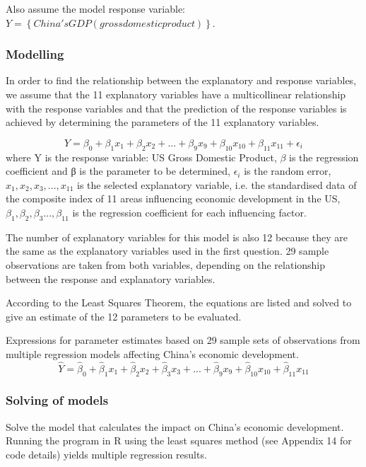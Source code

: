 \documentclass{apmcmthesis}
\begin{document}
Also assume the model response variable: $ Y=\left\lbrace China's GDP (gross domestic product)\right\rbrace . $
\subsubsection{Modelling}
In order to find the relationship between the explanatory and response variables, we assume that the 11 explanatory variables have a multicollinear relationship with the response variables and that the prediction of the response variables is achieved by determining the parameters of the 11 explanatory variables.

\begin{equation}
	Y = \beta_0 + \beta_1x_1 + \beta_2x_2 + ...+ \beta_9x_9 + \beta_{10}x_{10} + \beta_{11}x_{11} + \epsilon_i
\end{equation}
where Y is the response variable: US Gross Domestic Product, $\beta $ is the regression coefficient and β is the parameter to be determined, $ \epsilon_i $ is the random error, $ x_1,x_2,x_3,...,x_{11} $ is the selected explanatory variable, i.e. the standardised data of the composite index of 11 areas influencing economic development in the US, $ \beta_1,\beta_2,\beta_3...,\beta_{11} $ is the regression coefficient for each influencing factor. 

The number of explanatory variables for this model is also 12 because they are the same as the explanatory variables used in the first question. 29 sample observations are taken from both variables, depending on the relationship between the response and explanatory variables.

According to the Least Squares Theorem, the equations are listed and solved to give an estimate of the 12 parameters to be evaluated.

Expressions for parameter estimates based on 29 sample sets of observations from multiple regression models affecting China's economic development.
\begin{equation}
	\hat{Y} = \hat{\beta}_0 +\hat{\beta}_1x_1 +\hat{\beta}_2x_2 + \hat{\beta}_3x_3 +...+ \hat{\beta}_9x_9 +\hat{\beta}_{10}x_{10} +\hat{\beta}_{11}x_{11} 
\end{equation}

\subsubsection{Solving of models}
Solve the model that calculates the impact on China's economic development.
Running the program in R using the least squares method (see Appendix 14 for code details) yields multiple regression results. 
\end{document}
